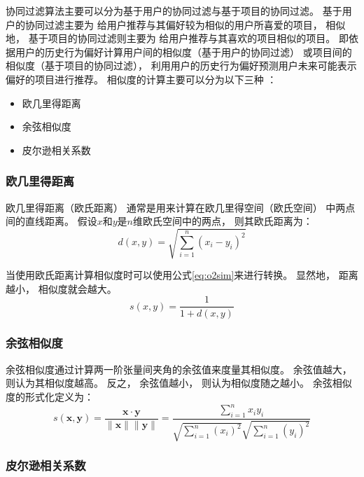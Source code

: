 协同过滤算法主要可以分为基于用户的协同过滤与基于项目的协同过滤。
基于用户的协同过滤主要为
给用户推荐与其偏好较为相似的用户所喜爱的项目，
相似地，
基于项目的协同过滤则主要为
给用户推荐与其喜欢的项目相似的项目。
即依据用户的历史行为偏好计算用户间的相似度（基于用户的协同过滤）
或项目间的相似度（基于项目的协同过滤），
利用用户的历史行为偏好预测用户未来可能表示偏好的项目进行推荐。
相似度的计算主要可以分为以下三种
\cite{heJiYuJuanJiShenJingWangLuoDeYinLeTuiJianXiTong2019}：
\begin{itemize}
    \item 欧几里得距离
    \item 余弦相似度
    \item 皮尔逊相关系数
\end{itemize}

\subsubsection{欧几里得距离}

欧几里得距离（欧氏距离）
通常是用来计算在欧几里得空间（欧氏空间）
中两点间的直线距离。
假设$x$和$y$是$n$维欧氏空间中的两点，
则其欧氏距离为：
\begin{equation}
    d(x,y)=\sqrt{\sum_{i=1}^n\left(x_i-y_i\right)^2}
\end{equation}

当使用欧氏距离计算相似度时可以使用公式\cref{eq:o2sim}来进行转换。
显然地，
距离越小，
相似度就会越大。
\begin{equation}
    \label{eq:o2sim}
    s(x,y)=\frac{1}{1+d(x,y)}
\end{equation}

\subsubsection{余弦相似度}

余弦相似度通过计算两一阶张量间夹角的余弦值来度量其相似度。
余弦值越大，
则认为其相似度越高。
反之，
余弦值越小，
则认为相似度随之越小。
余弦相似度的形式化定义为：
\begin{equation}
    s(\mathbf{x},\mathbf{y})=
    \frac{\mathbf{x}\cdot\mathbf{y}}{\lVert\mathbf{x}\rVert\lVert\mathbf{y}\rVert}
    =\frac{\sum_{i=1}^nx_iy_i}{\sqrt{\sum_{i=1}^n\left(x_i\right)^2}\sqrt{\sum_{i=1}^n\left(y_i\right)^2}}
\end{equation}

\subsubsection{皮尔逊相关系数}

